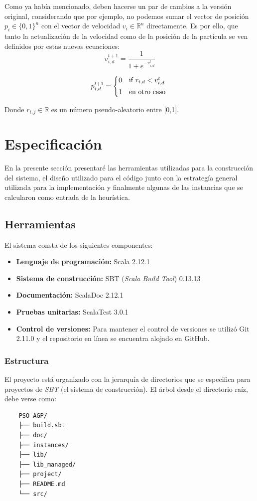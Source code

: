 \documentclass[12pt]{article}
\begin{document}
Como ya había mencionado, deben hacerse un par de cambios a la versión original, considerando que
por ejemplo, no podemos sumar el vector de posición $p_i \in \{0,1\}^n$ con el vector de velocidad
$v_i \in \mathbb{R}^n$ directamente.
Es por ello, que tanto la actualización de la velocidad como de la posición de la partícula se ven definidos por estas nuevas ecuaciones:
\begin{equation}
  v_{i,d}^{t+1} = \frac{1}{1+e^{-v_{i,d}^t}}
\end{equation}

\begin{equation}
  p_{i,d}^{t+1} =
    \begin{cases*}
      0 & if $r_{i,d} < v_{i,d}^{t}$ \\
      1 & en otro caso
    \end{cases*}
\end{equation}

Donde $r_{i,j} \in \mathbb{R}$ es un número pseudo-aleatorio entre [0,1].

\section{Especificación}
En la presente sección presentaré las herramientas utilizadas para la construcción del sistema, el
diseño utilizado para el código junto con la estrategía general utilizada para la implementación y finalmente algunas de las instancias que se calcularon como entrada de la heurística.

\subsection{Herramientas}
El sistema consta de los siguientes componentes:
\begin{itemize}
\item \textbf{Lenguaje de programación:} Scala 2.12.1
\item \textbf{Sistema de construcción:} SBT (\textit{Scala Build Tool}) 0.13.13
\item \textbf{Documentación:} ScalaDoc 2.12.1
\item \textbf{Pruebas unitarias:} ScalaTest 3.0.1
\item \textbf{Control de versiones:} Para mantener el control de versiones se utilizó Git 2.11.0 y el repositorio en línea se encuentra alojado en GitHub.
\end{itemize}
\subsubsection*{Estructura}\label{sec:e}
El proyecto está organizado con la jerarquía de directorios que se
especifica para proyectos de \textit{SBT} (el sistema de construcción).
El árbol desde el directorio raíz, debe verse como:
\begin{verbatim}
    PSO-AGP/
    ├── build.sbt
    ├── doc/
    ├── instances/
    ├── lib/
    ├── lib_managed/
    ├── project/
    ├── README.md
    └── src/
\end{verbatim}
\end{document}
